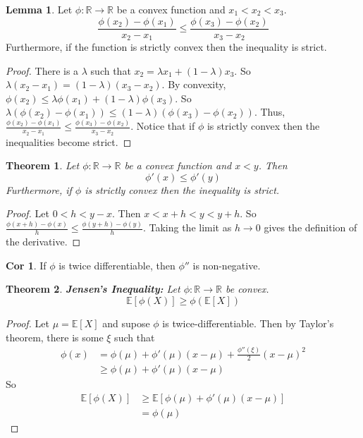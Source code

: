 \documentclass{article}
\newtheorem{theorem}{Theorem}
\theoremstyle{definition}\newtheorem{definition}{DEF}
\theoremstyle{definition}\newtheorem{example}{Ex}
\theoremstyle{lemma}\newtheorem{lemma}{Lemma}
\theoremstyle{corrolary}\newtheorem{corrolary}{Cor}
\begin{document}
\begin{lemma}
Let $\phi:\mathbb{R}\rightarrow \mathbb{R}$ be a convex function and $x_1 < x_2 < x_3$.
\begin{equation}
\frac{\phi(x_2)-\phi(x_1)}{x_2 - x_1} \leq \frac{\phi(x_3)-\phi(x_2)}{x_3-x_2}
\end{equation}
Furthermore, if the function is strictly convex then the inequality is strict.
\end{lemma}
\begin{proof}
There is a $\lambda$ such that $x_2 = \lambda x_1 + (1-\lambda) x_3$.
So $\lambda (x_2 - x_1) = (1-\lambda) (x_3 -x_2)$.
By convexity, $\phi(x_2)\leq\lambda\phi(x_1)+(1-\lambda)\phi(x_3)$.
So $\lambda (\phi (x_2)-\phi(x_1))\leq(1-\lambda)(\phi(x_3)-\phi(x_2))$.
Thus, $\frac{\phi(x_2)-\phi(x_1)}{x_2 - x_1} \leq \frac{\phi(x_3)-\phi(x_2)}{x_3-x_2}$.
Notice that if $\phi$ is strictly convex then the inequalities become strict.
\end{proof}

\begin{theorem}
Let $\phi:\mathbb{R}\rightarrow\mathbb{R}$ be a convex function and $x<y$.
Then
\begin{equation}
\phi'(x)\leq\phi'(y)
\end{equation}
Furthermore, if $\phi$ is strictly convex then the inequality is strict.
\end{theorem}
\begin{proof}
Let $0<h<y-x$.
Then $x<x+h<y<y+h$.
So $\frac{\phi(x+h)-\phi(x)}{h}\leq \frac{\phi(y+h)-\phi(y)}{h}$.
Taking the limit as $h\rightarrow 0$ gives the definition of the derivative.
\end{proof}
\begin{corrolary}
If $\phi$ is twice differentiable, then $\phi''$ is non-negative.
\end{corrolary}

\begin{theorem}
\textbf{Jensen's Inequality:}
Let $\phi:\mathbb{R}\rightarrow \mathbb{R}$ be convex.
\begin{equation}
\mathbb{E}[\phi(X)]\geq \phi(\mathbb{E}[X])
\end{equation}
\end{theorem}
\begin{proof}
Let $\mu=\mathbb{E}[X]$ and supose $\phi$ is twice-differentiable.
Then by Taylor's theorem, there is some $\xi$ such that
\begin{align*}
\phi(x)&=\phi(\mu)+\phi'(\mu)(x-\mu)+\frac{\phi''(\xi)}{2}(x-\mu)^2\\
&\geq \phi(\mu)+\phi'(\mu)(x-\mu)
\end{align*}
So
\begin{align*}
\mathbb{E}[\phi(X)]&\geq \mathbb{E}[\phi(\mu)+\phi'(\mu)(x-\mu)]\\
&=\phi(\mu)
\end{align*}
\end{proof}
\end{document}
